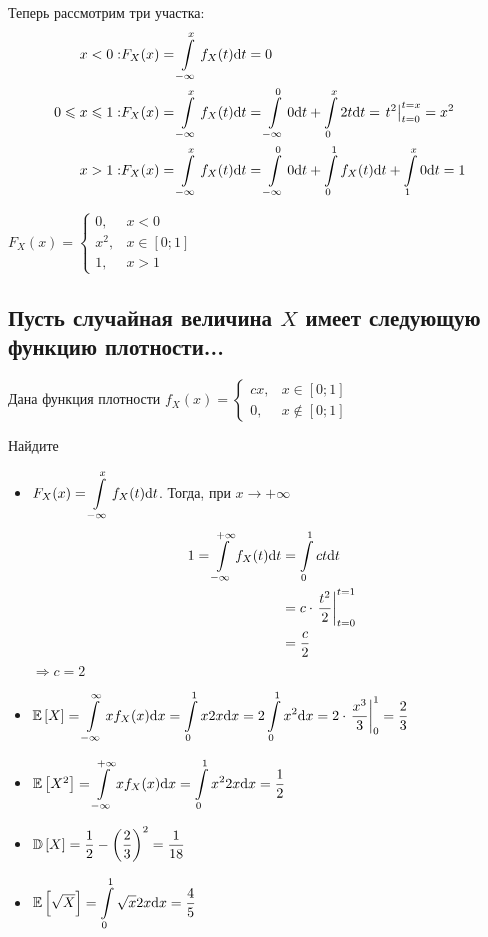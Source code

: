 \documentclass{article}
\begin{document}
\begin{itemize}
    Теперь рассмотрим три участка:
    \begin{equation*}
        \begin{aligned}
            x<0:& F_{X}(x)=\int\limits_{-\infty}^{x}f_{X}(t)\text{d}t=0\\
            0\leqslant x\leqslant 1:& F_{X}(x)=\int\limits_{-\infty}^{x}f_{X}(t)\text{d}t=\int\limits_{-\infty}^{0}0\text{d}t+\int\limits_{0}^x 2t\text{d}t=\left.t^2\right\vert_{t=0}^{t=x}=x^2\\
            x>1:& F_{X}(x)=\int\limits_{-\infty}^{x}f_{X}(t)\text{d}t=\int\limits_{-\infty}^0 0\text{d}t+\int\limits_{0}^1 f_{X}(t)\text{d}t+\int\limits_{1}^x0\text{d}t=1
        \end{aligned}
    \end{equation*}

    $F_{X}(x)=\begin{cases}
        0,&x<0\\
        x^2,&x\in[0;1]\\
        1,&x>1
    \end{cases}$
\end{itemize}


\subsection{Пусть случайная величина $X$ имеет следующую функцию плотности...}
Дана функция плотности $f_{X}(x)=\begin{cases}
    cx,&x\in[0;1]\\
    0,&x\not\in[0;1]
\end{cases}$

Найдите
\begin{itemize}
    \item $F_X(x)=\displaystyle\int\limits_{-\infty}^{x} f_X(t)\text{d}t$. Тогда, при $x\to+\infty$
    \begin{equation*}
        \begin{aligned}
            1=\int\limits_{-\infty}^{+\infty} f_X(t)\text{d}t&=\int\limits_0^1 ct\text{d}t\\
            &=c\cdot\left.\frac{t^2}{2}\right\vert_{t=0}^{t=1}\\
            &=\frac{c}{2}
        \end{aligned}
    \end{equation*}
    $\Longrightarrow c=2$

    \item $\mathbb{E}\left[X\right]=\displaystyle\int\limits_{-\infty}^{\infty}xf_{X}(x)\text{d}x=\int\limits_{0}^1 x2x\text{d}x=2\int\limits_0^1 x^2\text{d}x=2\cdot\left.\frac{x^3}{3}\right\vert_{0}^1=\frac{2}{3}$
    \item $\mathbb{E}\left[X^2\right]=\displaystyle\int\limits_{-\infty}^{+\infty}xf_{X}(x)\text{d}x=\int\limits_{0}^1x^2 2x\text{d}x=\frac{1}{2}$
    \item $\mathbb{D}\left[X\right]=\displaystyle\frac{1}{2}-\left(\frac{2}{3}\right)^2=\frac{1}{18}$
    \item $\mathbb{E}\left[\sqrt{X}\right]=\displaystyle\int\limits_{0}^1\sqrt{x}2x\text{d}x=\frac{4}{5}$
\end{itemize}
\end{document}
